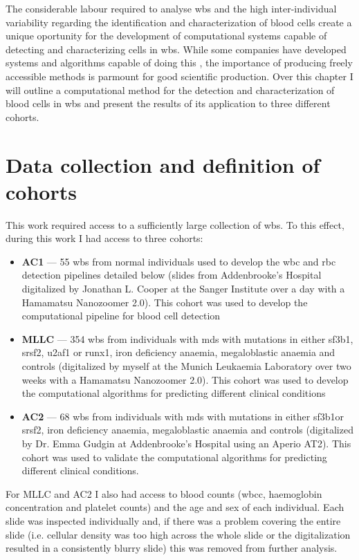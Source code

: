 The considerable labour required to analyse \ac{wbs} and the high inter-individual variability regarding the identification and characterization of blood cells create a unique oportunity for the development of computational systems capable of detecting and characterizing cells in \ac{wbs}. While some companies have developed systems and algorithms capable of doing this \cite{cellavision,advia-120}, the importance of producing freely accessible methods is parmount for good scientific production. Over this chapter I will outline a computational method for the detection and characterization of blood cells in \ac{wbs} and present the results of its application to three different cohorts.

\section{Data collection and definition of cohorts}

This work required access to a sufficiently large collection of \ac{wbs}. To this effect, during this work I had access to three cohorts:

\begin{itemize}
    \item \textbf{AC1} --- 55 \ac{wbs} from normal individuals used to develop the \ac{wbc} and \ac{rbc} detection pipelines detailed below (slides from Addenbrooke's Hospital digitalized by Jonathan L. Cooper at the Sanger Institute over a day with a Hamamatsu Nanozoomer 2.0). This cohort was used to develop the computational pipeline for blood cell detection
    \item \textbf{MLLC} --- 354 \ac{wbs} from individuals with \ac{mds} with mutations in either \ac{sf3b1}, \ac{srsf2}, \ac{u2af1} or \ac{runx1}, iron deficiency anaemia, megaloblastic anaemia and controls (digitalized by myself at the Munich Leukaemia Laboratory over two weeks with a Hamamatsu Nanozoomer 2.0). This cohort was used to develop the computational algorithms for predicting different clinical conditions
    \item \textbf{AC2} --- 68 \ac{wbs} from individuals with \ac{mds} with mutations in either \ac{sf3b1}or \ac{srsf2}, iron deficiency anaemia, megaloblastic anaemia and controls (digitalized by Dr. Emma Gudgin at Addenbrooke's Hospital using an Aperio AT2). This cohort was used to validate the computational algorithms for predicting different clinical conditions.
\end{itemize}

For MLLC and AC2 I also had access to blood counts (\ac{wbcc}, haemoglobin concentration and platelet counts) and the age and sex of each individual. Each slide was inspected individually and, if there was a problem covering the entire slide (i.e. cellular density was too high across the whole slide or the digitalization resulted in a consistently blurry slide) this was removed from further analysis.

